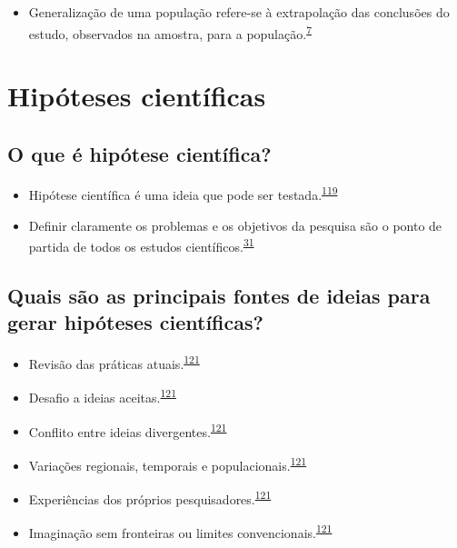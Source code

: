 \documentclass[
  a4paper,
]{book}
\providecommand{\tightlist}{%
  \setlength{\itemsep}{0pt}\setlength{\parskip}{0pt}}
\begin{document}
\begin{itemize}
\tightlist
\item
  Generalização de uma população refere-se à extrapolação das conclusões do estudo, observados na amostra, para a população.\textsuperscript{\protect\hyperlink{ref-Banerjee2010}{7}}
\end{itemize}

\hypertarget{ideias-hipoteses}{%
\section{Hipóteses científicas}\label{ideias-hipoteses}}

\hypertarget{o-que-uxe9-hipuxf3tese-cientuxedfica}{%
\subsection{O que é hipótese científica?}\label{o-que-uxe9-hipuxf3tese-cientuxedfica}}

\begin{itemize}
\item
  Hipótese científica é uma ideia que pode ser testada.\textsuperscript{\protect\hyperlink{ref-Curran-Everett2009}{119}}
\item
  Definir claramente os problemas e os objetivos da pesquisa são o ponto de partida de todos os estudos científicos.\textsuperscript{\protect\hyperlink{ref-van2022a}{31}}
\end{itemize}

\hypertarget{quais-suxe3o-as-principais-fontes-de-ideias-para-gerar-hipuxf3teses-cientuxedficas}{%
\subsection{Quais são as principais fontes de ideias para gerar hipóteses científicas?}\label{quais-suxe3o-as-principais-fontes-de-ideias-para-gerar-hipuxf3teses-cientuxedficas}}

\begin{itemize}
\item
  Revisão das práticas atuais.\textsuperscript{\protect\hyperlink{ref-Vandenbroucke2018}{121}}
\item
  Desafio a ideias aceitas.\textsuperscript{\protect\hyperlink{ref-Vandenbroucke2018}{121}}
\item
  Conflito entre ideias divergentes.\textsuperscript{\protect\hyperlink{ref-Vandenbroucke2018}{121}}
\item
  Variações regionais, temporais e populacionais.\textsuperscript{\protect\hyperlink{ref-Vandenbroucke2018}{121}}
\item
  Experiências dos próprios pesquisadores.\textsuperscript{\protect\hyperlink{ref-Vandenbroucke2018}{121}}
\item
  Imaginação sem fronteiras ou limites convencionais.\textsuperscript{\protect\hyperlink{ref-Vandenbroucke2018}{121}}
\end{itemize}
\end{document}
